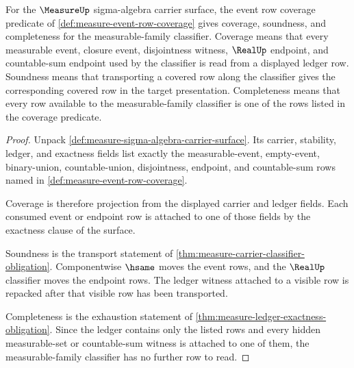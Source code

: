 \begin{theorem}
\label{thm:measure-measurable-family-exactness}
For the $\MeasureUp$ sigma-algebra carrier surface, the event row coverage
predicate of \autoref{def:measure-event-row-coverage} gives coverage,
soundness, and completeness for the measurable-family classifier. Coverage
means that every measurable event, closure event, disjointness witness,
$\RealUp$ endpoint, and countable-sum endpoint used by the classifier is read
from a displayed ledger row. Soundness means that transporting a covered row
along the classifier gives the corresponding covered row in the target
presentation. Completeness means that every row available to the
measurable-family classifier is one of the rows listed in the coverage
predicate.
\end{theorem}
\begin{proof}
Unpack \autoref{def:measure-sigma-algebra-carrier-surface}. Its carrier,
stability, ledger, and exactness fields list exactly the measurable-event,
empty-event, binary-union, countable-union, disjointness, endpoint, and
countable-sum rows named in \autoref{def:measure-event-row-coverage}.

Coverage is therefore projection from the displayed carrier and ledger fields.
Each consumed event or endpoint row is attached to one of those fields by the
exactness clause of the surface.

Soundness is the transport statement of
\autoref{thm:measure-carrier-classifier-obligation}. Componentwise $\hsame$
moves the event rows, and the $\RealUp$ classifier moves the endpoint rows.
The ledger witness attached to a visible row is repacked after that visible row
has been transported.

Completeness is the exhaustion statement of
\autoref{thm:measure-ledger-exactness-obligation}. Since the ledger contains
only the listed rows and every hidden measurable-set or countable-sum witness
is attached to one of them, the measurable-family classifier has no further
row to read.
\end{proof}


